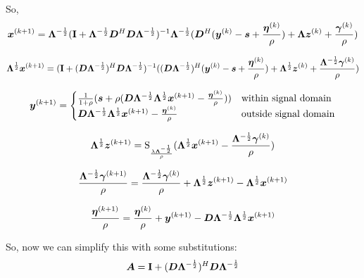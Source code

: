 \documentclass{article}
\begin{document}
So,
\begin{equation}
\bm{x}^{(k + 1)} = \bm{\Lambda}^{-\frac{1}{2}}({\bf I} + \bm{\Lambda}^{-\frac{1}{2}}\bm{D}^H\bm{D}\bm{\Lambda}^{-\frac{1}{2}})^{-1}\bm{\Lambda}^{-\frac{1}{2}}(\bm{D}^H(\bm{y}^{(k)} - \bm{s} + \frac{\bm{\eta}^{(k)}}{\rho}) + \bm{\Lambda}\bm{z}^{(k)} + \frac{\bm{\gamma}^{(k)}}{\rho})
\end{equation}



\begin{equation}
\bm{\Lambda}^{\frac{1}{2}}\bm{x}^{(k + 1)} = ({\bf I} + (\bm{D}\bm{\Lambda}^{-\frac{1}{2}})^H\bm{D}\bm{\Lambda}^{-\frac{1}{2}})^{-1}((\bm{D}\bm{\Lambda}^{-\frac{1}{2}})^H(\bm{y}^{(k)} - \bm{s} + \frac{\bm{\eta}^{(k)}}{\rho}) + \bm{\Lambda}^{\frac{1}{2}}\bm{z}^{(k)} + \frac{\bm{\Lambda}^{-\frac{1}{2}}\bm{\gamma}^{(k)}}{\rho})
\end{equation}

\begin{equation}
\bm{y}^{(k + 1)}= \begin{cases}
\frac{1}{1 + \rho}(\bm{s} + \rho(\bm{D}\bm{\Lambda}^{-\frac{1}{2}}\bm{\Lambda}^{\frac{1}{2}}\bm{x}^{(k + 1)} - \frac{\bm{\eta}^{(k)}}{\rho})) & \text{within signal domain}\\
\bm{D}\bm{\Lambda}^{-\frac{1}{2}}\bm{\Lambda}^{\frac{1}{2}}\bm{x}^{(k + 1)} - \frac{\bm{\eta}^{(k)}}{\rho} & \text{outside signal domain}
\end{cases}
\end{equation}

\begin{equation}
\bm{\Lambda}^{\frac{1}{2}}\bm{z}^{(k + 1)}= \operatorname{S}_{\frac{\lambda\bm{\Lambda}^{-\frac{1}{2}}}{\rho}}(\bm{\Lambda}^{\frac{1}{2}}\bm{x}^{(k + 1)} - \frac{\bm{\Lambda}^{-\frac{1}{2}}\bm{\gamma}^{(k)}}{\rho})
\end{equation}

\begin{equation}
\frac{\bm{\Lambda}^{-\frac{1}{2}}\bm{\gamma}^{(k + 1)}}{\rho} = \frac{\bm{\Lambda}^{-\frac{1}{2}}\bm{\gamma}^{(k)}}{\rho} + \bm{\Lambda}^{\frac{1}{2}}\bm{z}^{(k + 1)} - \bm{\Lambda}^{\frac{1}{2}}\bm{x}^{(k + 1)}
\end{equation}

\begin{equation}
\frac{\bm{\eta}^{(k + 1)}}{\rho} = \frac{\bm{\eta}^{(k)}}{\rho} + \bm{y}^{(k + 1)} - \bm{D}\bm{\Lambda}^{-\frac{1}{2}}\bm{\Lambda}^{\frac{1}{2}}\bm{x}^{(k + 1)}
\end{equation}

So, now we can simplify this with some substitutions:
\begin{equation}
\bm{A} = {\bf I} + (\bm{D}\bm{\Lambda}^{-\frac{1}{2}})^H\bm{D}\bm{\Lambda}^{-\frac{1}{2}}
\end{equation}
\end{document}
